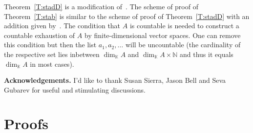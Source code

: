 \documentclass{amsart} \textwidth=18.0cm \oddsidemargin=-1cm \evensidemargin=-1cm \topmargin=-1cm \textheight=23cm
\theoremstyle{definition}
\begin{document}
Theorem~\ref{T:stadD} is a modification of~\cite[Lemma 3.1]{BLLM}. 
The scheme of proof of Theorem~\ref{T:stab} is similar to the scheme of proof of Theorem~\ref{T:stadD} with an addition given by~\cite[Lemma, Subsection~4.1.6]{Dix}. 
The condition that $A$ is countable is needed to construct a countable exhaustion of $A$ by finite-dimensional vector spaces. 
One can remove this condition but then the list $a_1, a_2, \ldots$ will be uncountable (the cardinality of the respective set lies inbetween $\dim_{\mathbb K}A$ and $\dim_{\mathbb K}A\times \mathbb N$ and thus it equals $\dim_{\mathbb K}A$ in most cases).

{\bf Acknowledgements.} I'd like to thank Susan Sierra, Jason Bell and Seva Gubarev for useful and stimulating discussions.
\section{Proofs}
\end{document}
